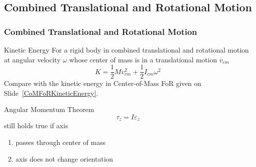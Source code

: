 \subsection{Combined Translational and Rotational Motion}
\begin{frame}
\frametitle{Combined Translational and Rotational Motion}
\begin{block}{Kinetic Energy}
For a rigid body in combined translational and rotational motion at angular velocity $\omega$ whose \alert{center of mass} is in a  translational motion $\overline v_{cm}$
\[K=\frac{1}{2}Mv_{cm}^2+\frac{1}{2}I_{cm}\omega^2\]
Compare with the kinetic energy in Center-of-Mass FoR given on Slide~\ref{CoMFoRKineticEnergy}.
\end{block}
\begin{block}{Angular Momentum Theorem}
\[\tau_z=I\varepsilon_z\]
still holds true if axis 
\begin{enumerate}
\item passes \alert{through} center of mass
\item axis does not change \alert{orientation}
\end{enumerate}
\end{block}
\end{frame}
